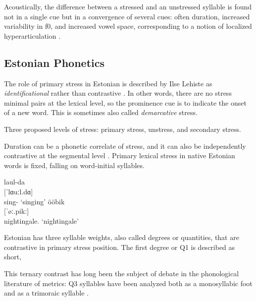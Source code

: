 Acoustically, the difference between a stressed and an unstressed syllable is found not in a single cue but in a convergence of several cues: often duration, increased variability in f0, and increased vowel space, corresponding to a notion of localized hyperarticulation \citep{smiljanicProductionPerceptionClear2005, de1995supraglottal, lindblom1990}. 



\subsection{Estonian Phonetics}
The role of primary stress in Estonian is described by Ilse Lehiste as {\it identificational} rather than contrastive \citep{lehistePhoneticsMetrics1992}. In other words, there are no stress minimal pairs at the lexical level, so the prominence cue is to indicate the onset of a new word. This is sometimes also called {\it demarcative} stress.



Three proposed levels of stress: primary stress, unstress, and secondary stress. \citep{lippusAcousticStudyEstonian2014a}

Duration can be a phonetic correlate of stress, and it can also be independently contrastive at the segmental level \citep{lehistePhoneticsMetrics1992}. 
Primary lexical stress in native Estonian words is fixed, falling on word-initial syllables. 
\cite{eekmeisterUralica98}
\begin{exe}
\ex \gll laul-da \\
	{[ˈlɑuːl.dɑ]} \\
	sing-\Tr{} 
	\glt	`singing'
\ex 	ööbik \\
	{[ˈøː.pikː]} \\
	nightingale.\Nom{} 
	\glt`nightingale'
\end{exe}

Estonian has three syllable weights, also called degrees or quantities, that are contrastive in primary stress position. The first degree or Q1 is described as short, 

This ternary contrast has long been the subject of debate in the phonological literature of metrics: Q3 syllables have been analyzed both as a monosyllabic foot \citep{princeMetricalTheoryEstonian1980} and as a trimoraic syllable \citep{hayesCompensatoryLengtheningMoraic1989, kuznetsovaEstonianWordProsody2018,prillopMoraeEstonianReply2020}. 


